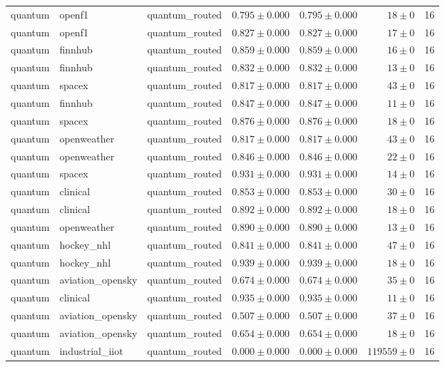 \begin{table}[htbp]
\begin{tabular}{l l l r r r r}
quantum & openf1 & quantum\_routed & $0.795\pm0.000$ & $0.795\pm0.000$ & $18\pm0$ & 16 \\
quantum & openf1 & quantum\_routed & $0.827\pm0.000$ & $0.827\pm0.000$ & $17\pm0$ & 16 \\
quantum & finnhub & quantum\_routed & $0.859\pm0.000$ & $0.859\pm0.000$ & $16\pm0$ & 16 \\
quantum & finnhub & quantum\_routed & $0.832\pm0.000$ & $0.832\pm0.000$ & $13\pm0$ & 16 \\
quantum & spacex & quantum\_routed & $0.817\pm0.000$ & $0.817\pm0.000$ & $43\pm0$ & 16 \\
quantum & finnhub & quantum\_routed & $0.847\pm0.000$ & $0.847\pm0.000$ & $11\pm0$ & 16 \\
quantum & spacex & quantum\_routed & $0.876\pm0.000$ & $0.876\pm0.000$ & $18\pm0$ & 16 \\
quantum & openweather & quantum\_routed & $0.817\pm0.000$ & $0.817\pm0.000$ & $43\pm0$ & 16 \\
quantum & openweather & quantum\_routed & $0.846\pm0.000$ & $0.846\pm0.000$ & $22\pm0$ & 16 \\
quantum & spacex & quantum\_routed & $0.931\pm0.000$ & $0.931\pm0.000$ & $14\pm0$ & 16 \\
quantum & clinical & quantum\_routed & $0.853\pm0.000$ & $0.853\pm0.000$ & $30\pm0$ & 16 \\
quantum & clinical & quantum\_routed & $0.892\pm0.000$ & $0.892\pm0.000$ & $18\pm0$ & 16 \\
quantum & openweather & quantum\_routed & $0.890\pm0.000$ & $0.890\pm0.000$ & $13\pm0$ & 16 \\
quantum & hockey\_nhl & quantum\_routed & $0.841\pm0.000$ & $0.841\pm0.000$ & $47\pm0$ & 16 \\
quantum & hockey\_nhl & quantum\_routed & $0.939\pm0.000$ & $0.939\pm0.000$ & $18\pm0$ & 16 \\
quantum & aviation\_opensky & quantum\_routed & $0.674\pm0.000$ & $0.674\pm0.000$ & $35\pm0$ & 16 \\
quantum & clinical & quantum\_routed & $0.935\pm0.000$ & $0.935\pm0.000$ & $11\pm0$ & 16 \\
quantum & aviation\_opensky & quantum\_routed & $0.507\pm0.000$ & $0.507\pm0.000$ & $37\pm0$ & 16 \\
quantum & aviation\_opensky & quantum\_routed & $0.654\pm0.000$ & $0.654\pm0.000$ & $18\pm0$ & 16 \\
quantum & industrial\_iiot & quantum\_routed & $0.000\pm0.000$ & $0.000\pm0.000$ & $119559\pm0$ & 16 \\

\end{tabular}
\end{table}
